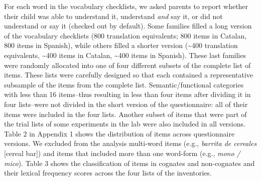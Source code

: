 \documentclass[
  english,
  man,man,floatsintext]{apa6}
\begin{document}
For each word in the vocabulary checklists, we asked parents to report whether their child was able to understand it, understand \emph{and} say it, or did not understand or say it (checked out by default). Some families filled a long version of the vocabulary checklists (800 translation equivalents; 800 items in Catalan, 800 items in Spanish), while others filled a shorter version (\textasciitilde400 translation equivalents, \textasciitilde400 items in Catalan, \textasciitilde400 items in Spanish). These last families were randomly allocated into one of four different subsets of the complete list of items. These lists were carefully designed so that each contained a representative subsample of the items from the complete list. Semantic/functional categories with less than 16 items--thus resulting in less than four items after dividing it in four lists--were not divided in the short version of the questionnaire: all of their items were included in the four lists. Another subset of items that were part of the trial lists of some experiments in the lab were also included in all versions. Table 2 in Appendix 1 shows the distribution of items across questionnaire versions. We excluded from the analysis multi-word items (e.g., \emph{barrita de cereales} {[}cereal bar{]}) and items that included more than one word-form (e.g., \emph{mono / mico}). Table 3 shows the classification of items in cognates and non-cognates and their lexical frequency scores across the four lists of the inventories.
\end{document}
